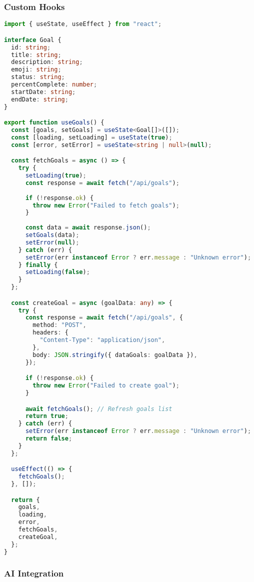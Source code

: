 \subsubsection{Custom Hooks}

\begin{lstlisting}[language=TypeScript, caption=app/hooks/useGoals.ts]
import { useState, useEffect } from "react";

interface Goal {
  id: string;
  title: string;
  description: string;
  emoji: string;
  status: string;
  percentComplete: number;
  startDate: string;
  endDate: string;
}

export function useGoals() {
  const [goals, setGoals] = useState<Goal[]>([]);
  const [loading, setLoading] = useState(true);
  const [error, setError] = useState<string | null>(null);

  const fetchGoals = async () => {
    try {
      setLoading(true);
      const response = await fetch("/api/goals");
      
      if (!response.ok) {
        throw new Error("Failed to fetch goals");
      }
      
      const data = await response.json();
      setGoals(data);
      setError(null);
    } catch (err) {
      setError(err instanceof Error ? err.message : "Unknown error");
    } finally {
      setLoading(false);
    }
  };

  const createGoal = async (goalData: any) => {
    try {
      const response = await fetch("/api/goals", {
        method: "POST",
        headers: {
          "Content-Type": "application/json",
        },
        body: JSON.stringify({ dataGoals: goalData }),
      });

      if (!response.ok) {
        throw new Error("Failed to create goal");
      }

      await fetchGoals(); // Refresh goals list
      return true;
    } catch (err) {
      setError(err instanceof Error ? err.message : "Unknown error");
      return false;
    }
  };

  useEffect(() => {
    fetchGoals();
  }, []);

  return {
    goals,
    loading,
    error,
    fetchGoals,
    createGoal,
  };
}
\end{lstlisting}

\subsubsection{AI Integration}

